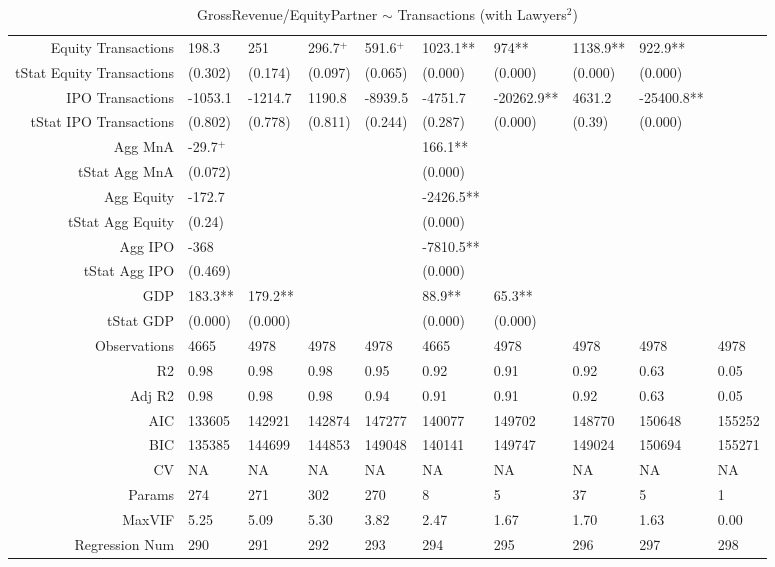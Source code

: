 \begin{table}[ht]
\begin{tabular}{rlllllllll}
  Equity Transactions & 198.3 & 251 & 296.7$^{+}$ & 591.6$^{+}$ & 1023.1** & 974** & 1138.9** & 922.9** &  \\ 
  tStat Equity Transactions & (0.302) & (0.174) & (0.097) & (0.065) & (0.000) & (0.000) & (0.000) & (0.000) &  \\ 
  IPO Transactions & -1053.1 & -1214.7 & 1190.8 & -8939.5 & -4751.7 & -20262.9** & 4631.2 & -25400.8** &  \\ 
  tStat IPO Transactions & (0.802) & (0.778) & (0.811) & (0.244) & (0.287) & (0.000) & (0.39) & (0.000) &  \\ 
  Agg MnA & -29.7$^{+}$ &  &  &  & 166.1** &  &  &  &  \\ 
  tStat Agg MnA & (0.072) &  &  &  & (0.000) &  &  &  &  \\ 
  Agg Equity & -172.7 &  &  &  & -2426.5** &  &  &  &  \\ 
  tStat Agg Equity & (0.24) &  &  &  & (0.000) &  &  &  &  \\ 
  Agg IPO & -368 &  &  &  & -7810.5** &  &  &  &  \\ 
  tStat Agg IPO & (0.469) &  &  &  & (0.000) &  &  &  &  \\ 
  GDP & 183.3** & 179.2** &  &  & 88.9** & 65.3** &  &  &  \\ 
  tStat GDP & (0.000) & (0.000) &  &  & (0.000) & (0.000) &  &  &  \\ 
  Observations & 4665 & 4978 & 4978 & 4978 & 4665 & 4978 & 4978 & 4978 & 4978 \\ 
  R2 & 0.98 & 0.98 & 0.98 & 0.95 & 0.92 & 0.91 & 0.92 & 0.63 & 0.05 \\ 
  Adj R2 & 0.98 & 0.98 & 0.98 & 0.94 & 0.91 & 0.91 & 0.92 & 0.63 & 0.05 \\ 
  AIC & 133605 & 142921 & 142874 & 147277 & 140077 & 149702 & 148770 & 150648 & 155252 \\ 
  BIC & 135385 & 144699 & 144853 & 149048 & 140141 & 149747 & 149024 & 150694 & 155271 \\ 
  CV & NA & NA & NA & NA & NA & NA & NA & NA & NA \\ 
  Params & 274 & 271 & 302 & 270 & 8 & 5 & 37 & 5 & 1 \\ 
  MaxVIF & 5.25 & 5.09 & 5.30 & 3.82 & 2.47 & 1.67 & 1.70 & 1.63 & 0.00 \\ 
  Regression Num & 290 & 291 & 292 & 293 & 294 & 295 & 296 & 297 & 298 \\ 
   \hline
\end{tabular}
\caption{GrossRevenue/EquityPartner $\sim$ Transactions (with Lawyers$^2$)} 
\end{table}
